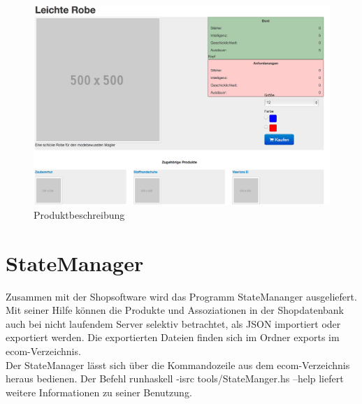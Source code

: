 \begin{figure}[h!]
  \centering
  \includegraphics[width=\textwidth]{img/Produktbeschreibung.png}
  \caption{Produktbeschreibung}
  \label{fig:Produktbeschreibung}
\end{figure}


\section{StateManager}
\label{sec:StateManager}
Zusammen mit der Shopsoftware wird das Programm StateMananger ausgeliefert. Mit seiner Hilfe können die Produkte und Assoziationen in der Shopdatenbank auch bei nicht laufendem Server selektiv betrachtet, als JSON importiert oder exportiert werden. Die exportierten Dateien finden sich im Ordner \textsf{exports} im \textsf{ecom}-Verzeichnis. \\
Der StateManager lässt sich über die Kommandozeile aus dem ecom-Verzeichnis heraus bedienen. Der Befehl \textsf{runhaskell -isrc tools/StateManger.hs --help} liefert weitere Informationen zu seiner Benutzung. 